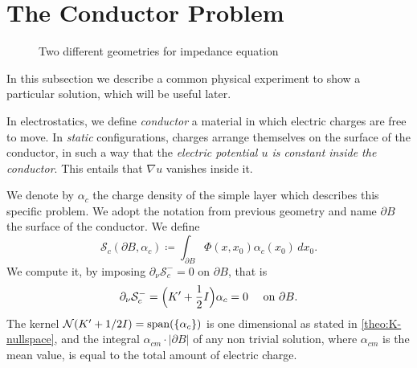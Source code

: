 \documentclass[10pt, a4paper, twoside, openright]{book}
\theoremstyle{definition}
\theoremstyle{plain}
\theoremstyle{plain}
\theoremstyle{plain}
\theoremstyle{plain}
\theoremstyle{plain}
\theoremstyle{plain}
\theoremstyle{plain}
\theoremstyle{plain}
\begin{document}
\section{The Conductor Problem}
\begin{figure}
\centering
{}
\caption{Two different geometries for impedance equation}
\label{fig:subfig}
\end{figure}
In this subsection we describe a common physical experiment to show a particular solution, which will be useful later.
\par
In electrostatics, we define \emph{conductor} a material in which electric charges are 
free to move. In \emph{static} configurations,
charges arrange themselves on the surface of the conductor, in such a way that the \emph{electric potential $u$ is constant inside the conductor}. 
This entails that $\nabla u$ vanishes inside it.
\par
We denote by $\alpha_{c}$ the charge density of the simple layer which describes this specific problem. We adopt the notation from previous geometry and name $\partial B$ the surface of the conductor.
We define
\begin{equation}
 \mathcal{S}_{c}(\partial B, \alpha_c)\coloneqq\int_{\partial B}\Phi(x,x_0)\alpha_{c}(x_0)\,dx_0.
\end{equation}
We compute it, by imposing $\partial_\nu \mathcal{S}_{c}^- = 0$ on $\partial B$, that is
\begin{equation}
 \partial_\nu\mathcal{S}_{c}^-=\Bigl(K'+\dfrac{1}{2}I\Bigr)\alpha_{c}= 0\quad\textup{ on }\partial B. \label{eq:alpha_c-equation}
\end{equation}
The kernel $\mathcal{N}(K' + 1/2 I)=\textup{span}(\{\alpha_{c}\})$ is one dimensional as stated in \ref{theo:K-nullspace}, and the integral $\alpha_{cm} \cdot|\partial B|$ of any non trivial solution, where $\alpha_{cm}$ is the mean value, is equal to the total amount of electric charge.
\end{document}
